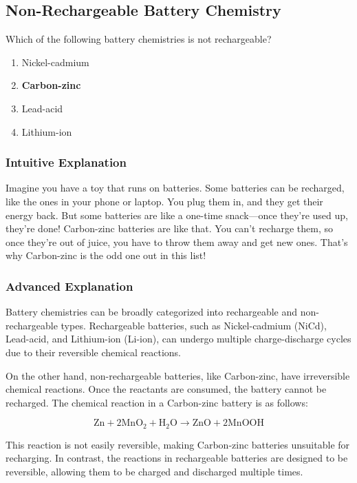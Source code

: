\subsection{Non-Rechargeable Battery Chemistry}
\label{T6A11}

\begin{tcolorbox}[colback=gray!10!white,colframe=black!75!black,title=T6A11]
Which of the following battery chemistries is not rechargeable?
\begin{enumerate}[label=\Alph*)]
    \item Nickel-cadmium
    \item \textbf{Carbon-zinc}
    \item Lead-acid
    \item Lithium-ion
\end{enumerate}
\end{tcolorbox}

\subsubsection{Intuitive Explanation}
Imagine you have a toy that runs on batteries. Some batteries can be recharged, like the ones in your phone or laptop. You plug them in, and they get their energy back. But some batteries are like a one-time snack—once they’re used up, they’re done! Carbon-zinc batteries are like that. You can’t recharge them, so once they’re out of juice, you have to throw them away and get new ones. That’s why Carbon-zinc is the odd one out in this list!

\subsubsection{Advanced Explanation}
Battery chemistries can be broadly categorized into rechargeable and non-rechargeable types. Rechargeable batteries, such as Nickel-cadmium (NiCd), Lead-acid, and Lithium-ion (Li-ion), can undergo multiple charge-discharge cycles due to their reversible chemical reactions. 

On the other hand, non-rechargeable batteries, like Carbon-zinc, have irreversible chemical reactions. Once the reactants are consumed, the battery cannot be recharged. The chemical reaction in a Carbon-zinc battery is as follows:

\[
\text{Zn} + 2\text{MnO}_2 + \text{H}_2\text{O} \rightarrow \text{ZnO} + 2\text{MnOOH}
\]

This reaction is not easily reversible, making Carbon-zinc batteries unsuitable for recharging. In contrast, the reactions in rechargeable batteries are designed to be reversible, allowing them to be charged and discharged multiple times.

